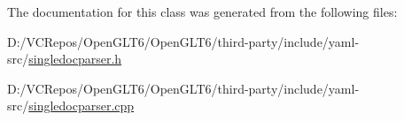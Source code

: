 The documentation for this class was generated from the following files\+:\begin{DoxyCompactItemize}
\item 
D\+:/\+V\+C\+Repos/\+Open\+G\+L\+T6/\+Open\+G\+L\+T6/third-\/party/include/yaml-\/src/\mbox{\hyperlink{singledocparser_8h}{singledocparser.\+h}}\item 
D\+:/\+V\+C\+Repos/\+Open\+G\+L\+T6/\+Open\+G\+L\+T6/third-\/party/include/yaml-\/src/\mbox{\hyperlink{singledocparser_8cpp}{singledocparser.\+cpp}}\end{DoxyCompactItemize}
